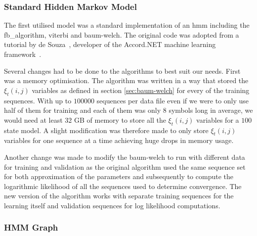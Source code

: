 \subsubsection{Standard Hidden Markov Model}

The first utilised model was a standard implementation of an \gls{hmm} including the \gls{fb_algorithm}, \gls{viterbi} and \gls{baum-welch}. The original code was adopted from a tutorial by de Souza~\cite{desouza_hmm}, developer of the Accord.NET machine learning framework~\cite{accord_net}.

Several changes had to be done to the algorithms to best suit our needs. First was a memory optimisation. The algorithm was written in a way that stored the $\xi_t(i,j)$ variables as defined in section \ref{sec:baum-welch} for every of the training sequences. With up to $100000$ sequences per data file even if we were to only use half of them for training and each of them was only $8$ symbols long in average, we would need at least $32$ GB of memory to store all the $\xi_t(i,j)$ variables for a $100$ state model. A slight modification was therefore made to only store $\xi_t(i,j)$ variables for one sequence at a time achieving huge drops in memory usage.

Another change was made to modify the \gls{baum-welch} to run with different data for training and validation as the original algorithm used the same sequence set for both approximation of the parameters and subsequently to compute the logarithmic likelihood of all the sequences used to determine convergence. The new version of the algorithm works with separate training sequences for the learning itself and validation sequences for log likelihood computations.



\subsubsection{HMM Graph}
